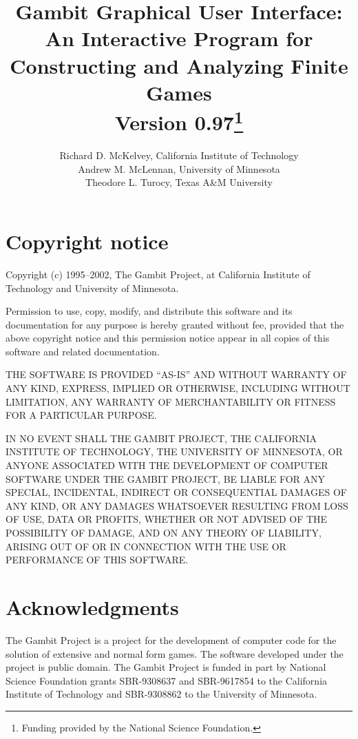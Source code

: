\documentclass[12pt]{report}
\title{Gambit Graphical User Interface:\\
An Interactive Program for Constructing and Analyzing Finite Games \\
Version 0.97\thanks{Funding provided by
the National Science Foundation.}}
\author{Richard D. McKelvey, California Institute of Technology \\
Andrew M. McLennan, University of Minnesota \\
Theodore L. Turocy, Texas A\&M University}
\begin{document}
%
\maketitle

\tableofcontents%

\chapter*{Copyright notice}%

Copyright (c) 1995--2002, The Gambit Project, at California Institute of
Technology and University of Minnesota.

Permission to use, copy, modify, and distribute this software and its
documentation for any purpose is hereby granted without fee, provided
that the above copyright notice and this permission notice appear in
all copies of this software and related documentation.

THE SOFTWARE IS PROVIDED ``AS-IS'' AND WITHOUT WARRANTY OF ANY KIND,
EXPRESS, IMPLIED OR OTHERWISE, INCLUDING WITHOUT LIMITATION, ANY
WARRANTY OF MERCHANTABILITY OR FITNESS FOR A PARTICULAR PURPOSE.
 
IN NO EVENT SHALL THE GAMBIT PROJECT, THE CALIFORNIA INSTITUTE OF
TECHNOLOGY, THE UNIVERSITY OF MINNESOTA, OR ANYONE ASSOCIATED WITH THE
DEVELOPMENT OF COMPUTER SOFTWARE UNDER THE GAMBIT PROJECT, BE LIABLE
FOR ANY SPECIAL, INCIDENTAL, INDIRECT OR CONSEQUENTIAL DAMAGES OF ANY
KIND, OR ANY DAMAGES WHATSOEVER RESULTING FROM LOSS OF USE, DATA OR
PROFITS, WHETHER OR NOT ADVISED OF THE POSSIBILITY OF DAMAGE, AND ON
ANY THEORY OF LIABILITY, ARISING OUT OF OR IN CONNECTION WITH THE USE
OR PERFORMANCE OF THIS SOFTWARE.


\chapter*{Acknowledgments}\label{gambitproject}

The Gambit Project is a project for the development of computer code
for the solution of extensive and normal form games.  The software
developed under the project is public domain. The Gambit Project is
funded in part by National Science Foundation grants SBR-9308637 and
SBR-9617854 to the California Institute of Technology and SBR-9308862
to the University of Minnesota.
\end{document}
